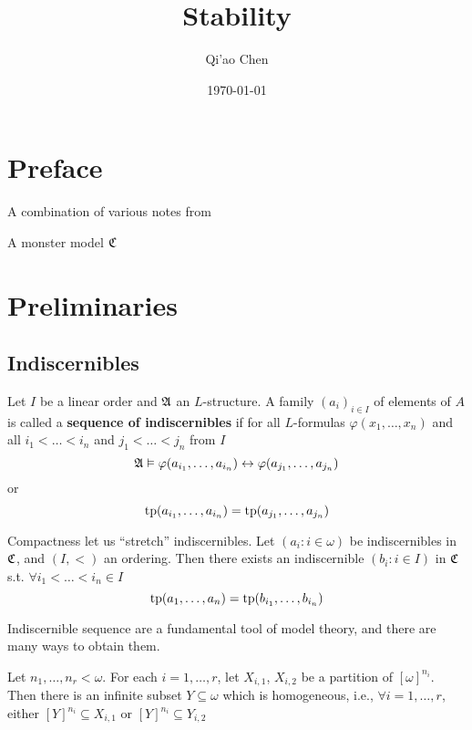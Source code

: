 \documentclass[11pt]{article}
\author{Qi'ao Chen}
\date{\today}
\title{Stability}
\begin{document}
\maketitle
\tableofcontents


\section{Preface}
\label{sec:orgdc30030}
A combination of various notes from \cite{PillayNoteStability} \cite{ChernNoteStability} \cite{tent2012course}

A monster model \(\mathfrak{C}\)
\section{Preliminaries}
\label{sec:org10a6757}
\subsection{Indiscernibles}
\label{sec:org9c8464d}
\begin{definition}[]
Let \(I\) be a linear order and \(\mathfrak{A}\) an \(L\)-structure. A family \((a_i)_{i\in I}\) of elements
of \(A\) is called a \textbf{sequence of indiscernibles}  if for all \(L\)-formulas \(\varphi(x_1,\dots,x_n)\) and
all \(i_1<\dots<i_n\) and \(j_1<\dots<j_n\) from \(I\)
\begin{equation*}
\mathfrak{A}\vDash\varphi(a_{i_1},\dots,a_{i_n})\leftrightarrow\varphi(a_{j_1},\dots,a_{j_n})
\end{equation*}
or
\begin{equation*}
\operatorname{tp}(a_{i_1},\dots,a_{i_n})=\operatorname{tp}(a_{j_1},\dots,a_{j_n})
\end{equation*}
\end{definition}

\begin{theorem}[]
Compactness let us ``stretch'' indiscernibles. Let \((a_i:i\in\omega)\) be indiscernibles in \(\mathfrak{C}\),
and \((I,<)\) an ordering. Then there exists an indiscernible \((b_i:i\in I)\) in \(\mathfrak{C}\)
s.t. \(\forall i_1<\dots<i_n\in I\)
\begin{equation*}
\operatorname{tp}(a_1,\dots,a_n)=\operatorname{tp}(b_{i_1},\dots,b_{i_n})
\end{equation*}
\end{theorem}

Indiscernible sequence are a fundamental tool of model theory, and there are many ways to obtain
them.

\begin{theorem}
Let \(n_1,\dots,n_r<\omega\). For each \(i=1,\dots,r\), let \(X_{i,1}\), \(X_{i,2}\) be a partition
of \([\omega]^{n_i}\). Then there is an infinite subset \(Y\subseteq\omega\) which is homogeneous,
i.e., \(\forall i=1,\dots,r\), either \([Y]^{n_i}\subseteq X_{i,1}\) or \([Y]^{n_i}\subseteq Y_{i,2}\)
\end{theorem}
\end{document}
